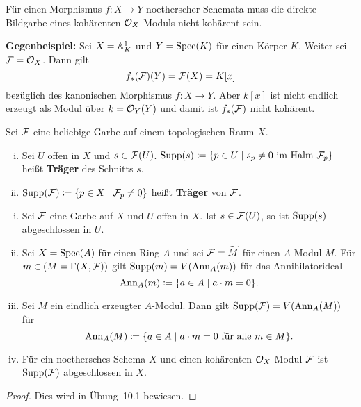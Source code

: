 \begin{bem}
\label{bem:9.11}
	Für einen Morphismus $f\colon X \to Y$ noetherscher Schemata muss die direkte Bildgarbe eines kohärenten $\mathcal{O}_X$-Moduls nicht kohärent sein.

	\textbf{Gegenbeispiel:} Sei $X=\mathbb {A}^1_K$ und $Y =\operatorname{Spec}(K)$ für einen Körper $K$. Weiter sei $\mathcal{F} = \mathcal{O}_X$. Dann gilt
	\[
		f_*(\mathcal{F})(Y) = \mathcal{F}(X) = K[x]
	\]
	bezüglich des kanonischen Morphismus $f\colon X \to Y$. Aber $k[x]$ ist nicht endlich erzeugt als Modul über $k=\mathcal{O}_Y(Y)$ und damit ist $f_*(\mathcal{F})$ nicht kohärent.
\end{bem}

\begin{defn}
\label{defn:9.12}
	Sei $\mathcal{F}$ eine beliebige Garbe auf einem topologischen Raum $X$. \begin{enumerate}[i)]
		\item\label{defn:9.12:i} Sei $U$ offen in $X$ und $s \in \mathcal{F}(U)$. $\operatorname{Supp}(s)\coloneqq \{p\in U \mid s_p\ne 0 \text{ im Halm } \mathcal{F}_p\}$ heißt \textbf{Träger} des Schnitts $s$.
		\item\label{defn:9.12:ii} $\operatorname{Supp}(\mathcal{F})\coloneqq \{ p \in X \mid \mathcal{F}_p \neq 0\}$ heißt \textbf{Träger} von $\mathcal{F}$.	
	\end{enumerate}
\end{defn}

\begin{lem}
\label{lem:9.13}
	\begin{enumerate}[i)]
		\item\label{lem:9.13:i} Sei $\mathcal{F}$ eine Garbe auf $X$ und $U$ offen in $X$. Ist $s \in \mathcal{F}(U)$, so ist $\operatorname{Supp}(s)$ abgeschlossen in $U$.
		\item\label{lem:9.13:ii} Sei $X=\operatorname{Spec}(A)$ für einen Ring $A$ und sei $\mathcal{F}=\widetilde{M}$ für einen $A$-Modul $M$. Für $m \in (M = \Gamma(X,\mathcal{F}))$ gilt $\operatorname{Supp}(m) = V(\operatorname{Ann}_A(m))$ für das Annihilatorideal
		\[
			\operatorname{Ann}_A(m) \coloneqq \{a \in A \mid a \cdot m = 0\}.
		\]
		\item\label{lem:9.13:iii} Sei $M$ ein eindlich erzeugter $A$-Modul. Dann gilt $\operatorname{Supp}(\mathcal{F})=V(\operatorname{Ann}_A(M))$ für
		\[
			\operatorname{Ann}_A(M) \coloneqq \{a \in A \mid a \cdot m = 0 \text{ für alle } m \in M\}.
		\]
		\item\label{lem:9.13:iv} Für ein noethersches Schema $X$ und einen kohärenten $\mathcal{O}_X$-Modul $\mathcal{F}$ ist $\operatorname{Supp}(\mathcal{F})$ abgeschlossen in $X$.
	\end{enumerate}
	\begin{proof}
		Dies wird in Übung~10.1 bewiesen. 
	\end{proof}
\end{lem}

